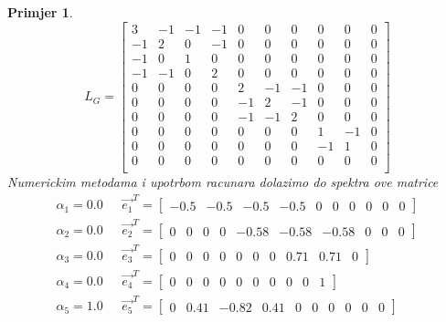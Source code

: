 \documentclass[11pt]{article}
\newtheorem{example}{Primjer}
\begin{document}
\begin{example}
		\[
		L_G =
		\begin{bmatrix}
		3   &  -1  &  -1  &  -1  &  0  &  0   &  0   &  0   &  0   &  0\\
		-1  &  2   &  0   &  -1  &  0  &  0   &  0   &  0   &  0   &  0\\
		-1  &  0   &  1   &  0   &  0  &  0   &  0   &  0   &  0   &  0\\
		-1  &  -1  &  0   &  2   &  0  &  0   &  0   &  0   &  0   &  0\\
		0   &  0   &  0   &  0   &  2  &  -1  &  -1  &  0   &  0   &  0\\
		0   &  0   &  0   &  0   &  -1 &  2   &  -1  &  0   &  0   &  0\\
		0   &  0   &  0   &  0   &  -1 &  -1  &  2   &  0   &  0   &  0\\
		0   &  0   &  0   &  0   &  0  &  0   &  0   &  1   &  -1  &  0\\
		0   &  0   &  0   &  0   &  0  &  0   &  0   &  -1  &  1   &  0\\
		0   &  0   &  0   &  0   &  0  &  0   &  0   &  0   &  0   &  0\\
		\end{bmatrix}
		\]
		Numerickim metodama i upotrbom racunara dolazimo do spektra ove matrice
		\[
		\begin{split}
			\alpha_1=0.0 \text{     } & \vec{e_1}^T = \begin{bmatrix} -0.5  &   -0.5  &  -0.5  &  -0.5  &  0  &  0  &  0  &  0  &  0  & 0      \end{bmatrix} \\ 
			\alpha_2=0.0 \text{     } & \vec{e_2}^T = \begin{bmatrix} 0  &   0  &  0  &  0  &  -0.58  &  -0.58  &  -0.58  &  0  &  0  & 0      \end{bmatrix} \\ 
			\alpha_3=0.0 \text{     } & \vec{e_3}^T = \begin{bmatrix} 0  &  0  &  0  &  0  &  0  &  0  &  0  &  0.71  &  0.71  &  0            \end{bmatrix} \\
			\alpha_4=0.0 \text{     } & \vec{e_4}^T = \begin{bmatrix} 0  &  0  &  0  &  0  &  0  &  0  &  0  &  0  &  0  &  1                  \end{bmatrix} \\
			\alpha_5=1.0 \text{     } & \vec{e_5}^T = \begin{bmatrix} 0  &  0.41  &  -0.82  &  0.41  &  0  &  0  &  0  &  0  &  0  &  0        \end{bmatrix} \\

\end{split}\]
\end{example}
\end{document}
